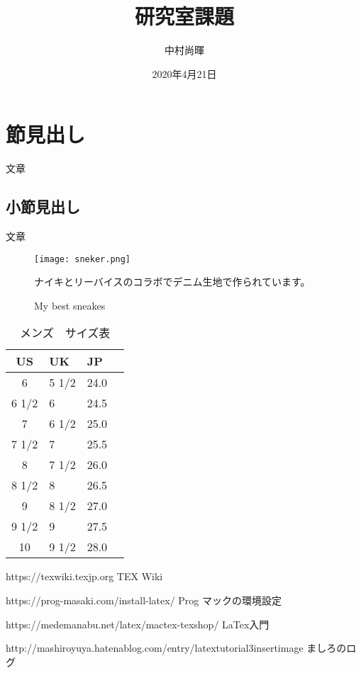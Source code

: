 \documentclass[12pt,leqno]{jarticle}
\begin{document}
 

\title{研究室課題} 
\author{中村尚暉}
\date{2020年4月21日} 
\maketitle

\section{節見出し}
文章

\subsection{小節見出し}
文章

\newpage

\begin{figure}[h]
   \begin{center}
     \caption{My best sneakes}
     \texttt{[image: sneker.png]}%
     
     
     
     ナイキとリーバイスのコラボでデニム生地で作られています。
     \end{center}
\end{figure}

\begin{table}[h]
 \caption{メンズ　サイズ表}
 \label{table:SpeedOfLight}
 \centering
  \begin{tabular}{clll}
   \hline
   US & UK & JP \\
   \hline \hline
   6 & 5 1/2 & 24.0 \\
   6 1/2 & 6 & 24.5  \\
   7 & 6 1/2 & 25.0 \\
   7 1/2 & 7 & 25.5  \\
   8 & 7 1/2 & 26.0  \\
   8 1/2 & 8 & 26.5  \\
   9 & 8 1/2 & 27.0  \\
   9 1/2 & 9 & 27.5  \\
   10 & 9 1/2 & 28.0  \\
   
   \hline
  \end{tabular}
\end{table}


\newpage



\begin{thebibliography}{99}
\item
  https://texwiki.texjp.org  TEX Wiki
\item
  https://prog-masaki.com/install-latex/      Prog マックの環境設定
\item
  https://medemanabu.net/latex/mactex-texshop/   LaTex入門
\item
http://mashiroyuya.hatenablog.com/entry/latextutorial3insertimage   ましろのログ　%
\end{thebibliography}
\end{document}
